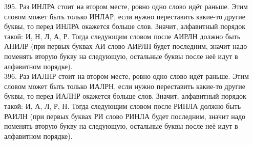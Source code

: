 \documentclass[12pt]{article}
\begin{document}
395. Раз ИНЛРА стоит на втором месте, ровно одно слово идёт раньше. Этим словом может быть только ИНЛАР, если нужно переставить какие-то другие буквы, то перед ИНЛРА окажется больше слов. Значит, алфавитный порядок такой: И, Н, Л, А, Р. Тогда следующим словом после АИРЛН должно быть АНИЛР (при первых буквах АИ слово АИРЛН будет последним, значит надо поменять вторую букву на следующую, остальные буквы после неё идут в алфавитном порядке).\\
396. Раз ИАЛНР стоит на втором месте, ровно одно слово идёт раньше. Этим словом может быть только ИАЛРН, если нужно переставить какие-то другие буквы, то перед ИАЛНР окажется больше слов. Значит, алфавитный порядок такой: И, А, Л, Р, Н. Тогда следующим словом после РИНЛА должно быть РАИЛН (при первых буквах РИ слово РИНЛА будет последним, значит надо поменять вторую букву на следующую, остальные буквы после неё идут в алфавитном порядке).
\end{document}
